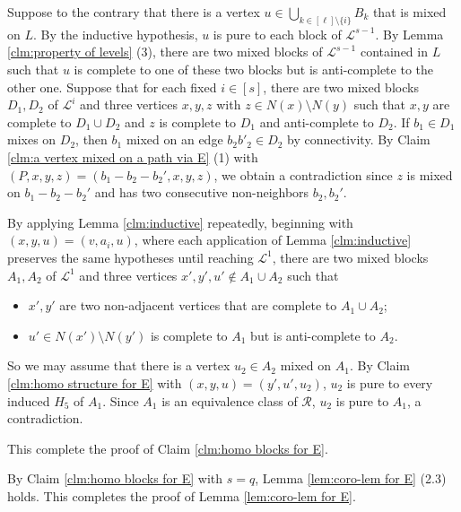 \documentclass[a4paper,11pt]{article}
\let\oldendproof\endproof
\renewenvironment{proof}[1][\proofname]{%
	\oldproof[\normalfont\bfseries #1]%
}{\oldendproof}
\renewcommand{\qedsymbol}{$\square$}%
\newenvironment{subproof}[1][\normalfont\it Subproof]{%
	\renewcommand{\qedsymbol}{{\tiny{$\blacksquare$}}}%
	\begin{proof}[#1]%
	}{%
	\end{proof}%
}
\begin{document}
\begin{proof}
\begin{subproof}[Proof of Claim \ref{clm:homo blocks for E}]
            Suppose to the contrary that there is a vertex $u\in \bigcup_{k\in [\ell]\setminus \{i\}} B_k$ that is mixed on $L$.  
            By the inductive hypothesis, $u$ is pure to each block of $\mathcal{L}^{s-1}$. 
            By Lemma \ref{clm:property of levels} (3), there are two mixed blocks of $\mathcal{L}^{s-1}$ contained in $L$ such that $u$ is complete to one of these two blocks but is anti-complete to the other one. 
            Suppose that for each fixed $i\in [s]$, there are two mixed blocks $D_1,D_2$ of $\mathcal{L}^i$ and three vertices $x,y,z$ with $z\in N(x)\setminus N(y)$ such that $x,y$ are complete to $D_1\cup D_2$ and $z$ is complete to $D_1$ and anti-complete to $D_2$. If $b_1\in D_1$ mixes on $D_2$, then $b_1$ mixed on an edge $b_2b'_2\in D_2$ by connectivity. 
            By Claim \ref{clm:a vertex mixed on a path via E} (1) with $(P,x,y,z)=(b_1-b_2-b_2',x,y,z)$, we obtain a contradiction since $z$ is mixed on $b_1-b_2-b_2'$ and has two consecutive non-neighbors $b_2,b_2'$.

            
            By applying Lemma \ref{clm:inductive} repeatedly, beginning with $(x,y,u)=(v,a_i,u)$, where each application of Lemma \ref{clm:inductive} preserves the same hypotheses until reaching $\mathcal{L}^1$, there are two mixed blocks $A_1,A_2$ of $\mathcal{L}^1$ and three vertices $x',y',u'\notin A_1\cup A_2$ such that 
            \begin{itemize}
                \item $x',y'$ are two non-adjacent vertices that are complete to $A_1\cup A_2$; 
                \item $u'\in N(x')\setminus N(y')$ is complete to $A_1$ but is anti-complete to $A_2$.  
            \end{itemize}  
            So we may assume that there is a vertex $u_2\in A_2$ mixed on $A_1$. 
            By Claim \ref{clm:homo structure for E} with $(x,y,u)=(y',u',u_2)$, $u_2$ is pure to every induced $H_5$ of $A_1$. 
            Since $A_1$ is an equivalence class of $\mathcal{R}$, $u_2$ is pure to $A_1$, a contradiction.  
            
            This complete the proof of Claim \ref{clm:homo blocks for E}. 
        \end{subproof} 
        
        By Claim \ref{clm:homo blocks for E} with $s=q$, Lemma \ref{lem:coro-lem for E} (2.3) holds.
        This completes the proof of Lemma \ref{lem:coro-lem for E}. 
    \end{proof}
\end{document}
